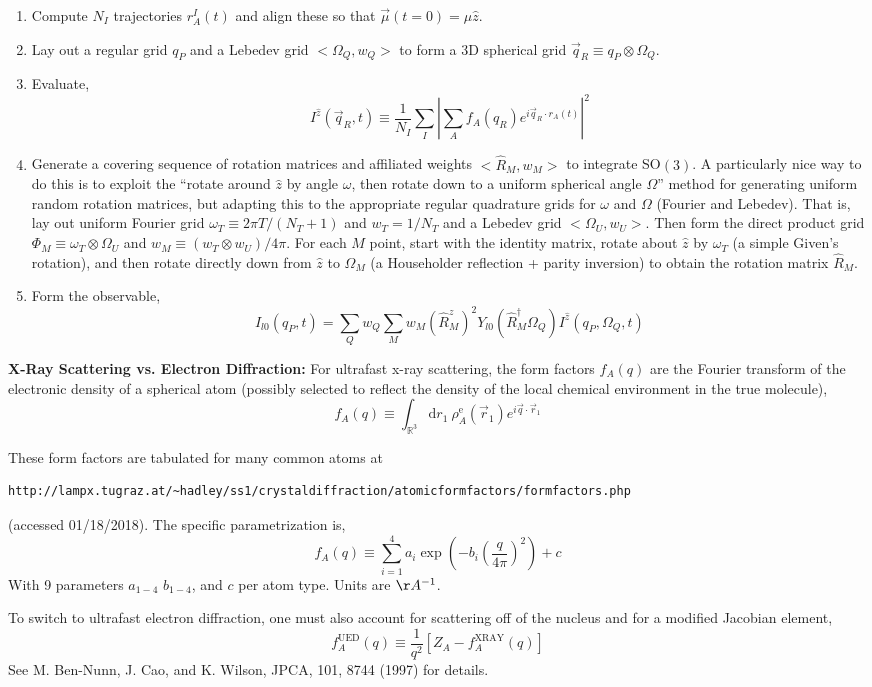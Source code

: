 \documentclass[fleqn,oneside,12pt]{article}
\begin{document}
\begin{enumerate}
\item Compute $N_I$ trajectories $r_{A}^{I} (t)$ and align these so that 
$\vec \mu (t = 0) = \mu \hat z$.
\item Lay out a regular grid $q_P$ and a Lebedev grid $<\Omega_Q, w_Q>$ to form
a 3D spherical grid $\vec q_R \equiv q_{P} \otimes \Omega_{Q}$.
\item Evaluate,
\[
I^{\hat z} (\vec q_R, t)
\equiv
\frac{1}{N_I}
\sum_{I}
\left |
\sum_{A}
f_{A} (q_R)
e^{i \vec q_R \cdot r_A (t)}
\right |^2
\]
\item Generate a covering sequence of rotation matrices and affiliated weights
$<\hat R_{M}, w_{M}>$ to integrate SO$(3)$. A particularly nice way to do this
is to exploit the ``rotate around $\hat z$ by angle $\omega$, then rotate down
to a uniform spherical angle $\Omega$'' method for generating uniform random
rotation matrices, but adapting this to the appropriate regular quadrature grids
for $\omega$ and $\Omega$ (Fourier and Lebedev).  That is, lay out uniform
Fourier grid $\omega_{T} \equiv 2 \pi T / (N_{T} + 1)$ and $w_T = 1 / N_{T}$ and
a Lebedev grid $<\Omega_{U}, w_{U}>$. Then form the direct product grid
$\Phi_{M} \equiv \omega_{T} \otimes \Omega_{U}$ and $w_{M} \equiv (w_{T} \otimes
w_{U}) / 4 \pi$.  For each $M$ point, start with the identity matrix, rotate
about $\hat z$ by $\omega_T$ (a simple Given's rotation), and then rotate
directly down from $\hat z$ to $\Omega_M$ (a Householder reflection + parity
inversion) to obtain the rotation matrix $\hat R_M$.

\item Form the observable,
\[
I_{l0} (q_{P}, t)
=
\sum_{Q}
w_{Q}
\sum_{M}
w_{M}
(\hat R_{M}^{z})^2
Y_{l0} (\hat R_{M}^{\dagger} \Omega_{Q})
I^{\hat z}
(q_{P}, \Omega_{Q}, t)
\]

\end{enumerate}

\textbf{X-Ray Scattering vs. Electron Diffraction:} For ultrafast x-ray
scattering, the form factors $f_{A} (q)$ are the Fourier transform of the
electronic density of a spherical atom (possibly selected to reflect the density
of the local chemical environment in the true molecule),
\[
f_{A} (q)
\equiv
\int_{\mathbb{R}^3}
\mathrm{d} r_1
\
\rho_{A}^{\mathrm{e}} (\vec r_{1})
e^{i \vec q \cdot \vec r_1}
\]

These form factors are tabulated for many common atoms at
\begin{verbatim}
http://lampx.tugraz.at/~hadley/ss1/crystaldiffraction/atomicformfactors/formfactors.php
\end{verbatim}
(accessed 01/18/2018). The specific parametrization is,
\[
f_{A} (q)
\equiv
\sum_{i=1}^{4}
a_{i}
\exp
\left (
-b_{i}
\left (
\frac{q}{4\pi}
\right )^2
\right )
+
c
\]
With 9 parameters $a_{1-4}$ $b_{1-4}$, and $c$ per atom type. Units are
$\AA{}^{-1}$.

To switch to ultrafast electron diffraction, one must also account for
scattering off of the nucleus and for a modified Jacobian element,
\[
f_{A}^{\mathrm{UED}}
(q)
\equiv
\frac{1}{q^2}
\left [
Z_{A}
-
f_{A}^{\mathrm{XRAY}}
(q)
\right ]
\]
See M. Ben-Nunn, J. Cao, and K. Wilson, JPCA, 101, 8744 (1997) for details.
\end{document}
